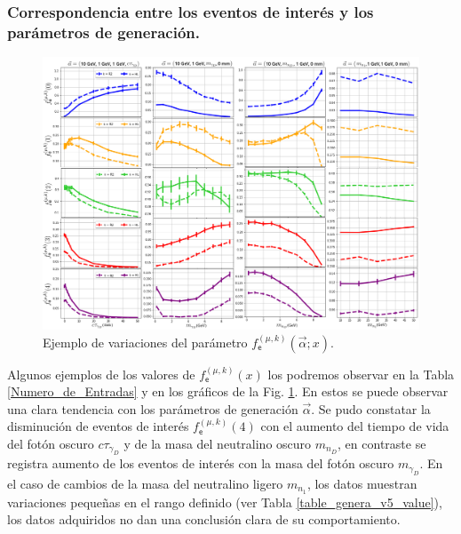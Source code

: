 \subsubsection{Correspondencia entre los eventos de interés y los parámetros de generación.}
\begin{figure}[!t]
\centering
\includegraphics[width=.9\textwidth]{Simulacion/imagenes/Comparacion_Distribucion_Entries0.png}
\caption{Ejemplo de variaciones del parámetro $f^{(\mu, k)}_\textsf{e} (\vec{\alpha}; x)$.}
\label{entradasALL}
\end{figure}

Algunos ejemplos de los valores de $f^{(\mu, k)}_\textsf{e} (x)$ los podremos observar en la Tabla \ref{Numero_de_Entradas} y en los gráficos de la Fig. \ref{entradasALL}. En estos se puede observar una clara tendencia con los parámetros de generación $\vec{\alpha}$. Se pudo constatar la disminución de eventos de interés $f^{(\mu, k)}_\textsf{e} (4)$ con el aumento del tiempo de vida del fotón oscuro $c\tau_{\gamma_D}$ y de la masa del neutralino oscuro $m_{n_D}$, en contraste se registra aumento de los eventos de interés con la masa del fotón oscuro $m_{\gamma_D}$. En el caso de cambios de la masa del neutralino ligero $m_{n_1}$, los datos muestran variaciones pequeñas en el rango definido (ver Tabla \ref{table_genera_v5_value}), los datos adquiridos no dan una conclusión clara de su comportamiento.




